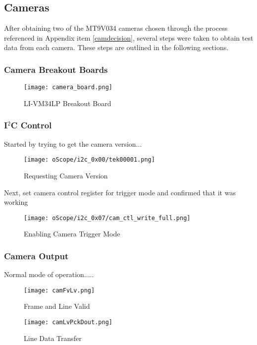 \subsection{Cameras}
After obtaining two of the MT9V034 cameras chosen through the process referenced in Appendix item \ref{camdecision}, several steps were taken to obtain test data from each camera. These steps are outlined in the following sections.

\subsubsection{Camera Breakout Boards}
\begin{figure}[H]
	\centerline{\texttt{[image: camera\_board.png]}}
	\caption{LI-VM34LP Breakout Board}
	\label{camBreakoutBoard}
\end{figure}

\subsubsection{I$^2$C Control} 
Started by trying to get the camera version...
\begin{figure}[H]
	\centerline{\texttt{[image: oScope/i2c\_0x00/tek00001.png]}}
	\caption{Requesting Camera Version}
	\label{camVersion}
\end{figure}

\par
Next, set camera control register for trigger mode and confirmed that it was working
\begin{figure}[H]
	\centerline{\texttt{[image: oScope/i2c\_0x07/cam\_ctl\_write\_full.png]}}
	\caption{Enabling Camera Trigger Mode}
	\label{camControl}
\end{figure}


\subsubsection{Camera Output}

Normal mode of operation.....
\begin{figure}[H]
	\centerline{\texttt{[image: camFvLv.png]}}
	\caption{Frame and Line Valid}
	\label{FvLv}
\end{figure}
\begin{figure}[H]
	\centerline{\texttt{[image: camLvPckDout.png]}}
	\caption{Line Data Transfer}
	\label{LvDout}
\end{figure}

